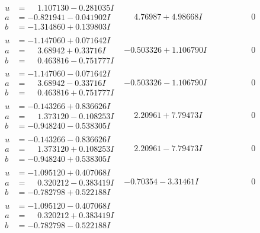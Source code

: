\documentclass[1p]{elsarticle_modified}
\theoremstyle{definition}
\begin{document}
$$\begin{array}{c|c|c}
\begin{aligned}
u &= \phantom{-}1.107130 - 0.281035 I \\
a &= -0.821941 - 0.041902 I \\
b &= -1.314860 + 0.139803 I\end{aligned}
 & \phantom{-}4.76987 + 4.98668 I & \phantom{-0.000000 } 0 \\ \hline\begin{aligned}
u &= -1.147060 + 0.071642 I \\
a &= \phantom{-}3.68942 + 0.33716 I \\
b &= \phantom{-}0.463816 - 0.751777 I\end{aligned}
 & -0.503326 + 1.106790 I & \phantom{-0.000000 } 0 \\ \hline\begin{aligned}
u &= -1.147060 - 0.071642 I \\
a &= \phantom{-}3.68942 - 0.33716 I \\
b &= \phantom{-}0.463816 + 0.751777 I\end{aligned}
 & -0.503326 - 1.106790 I & \phantom{-0.000000 } 0 \\ \hline\begin{aligned}
u &= -0.143266 + 0.836626 I \\
a &= \phantom{-}1.373120 - 0.108253 I \\
b &= -0.948240 - 0.538305 I\end{aligned}
 & \phantom{-}2.20961 + 7.79473 I & \phantom{-0.000000 } 0 \\ \hline\begin{aligned}
u &= -0.143266 - 0.836626 I \\
a &= \phantom{-}1.373120 + 0.108253 I \\
b &= -0.948240 + 0.538305 I\end{aligned}
 & \phantom{-}2.20961 - 7.79473 I & \phantom{-0.000000 } 0 \\ \hline\begin{aligned}
u &= -1.095120 + 0.407068 I \\
a &= \phantom{-}0.320212 - 0.383419 I \\
b &= -0.782798 + 0.522188 I\end{aligned}
 & -0.70354 - 3.31461 I & \phantom{-0.000000 } 0 \\ \hline\begin{aligned}
u &= -1.095120 - 0.407068 I \\
a &= \phantom{-}0.320212 + 0.383419 I \\
b &= -0.782798 - 0.522188 I\end{aligned}

\end{array}$$
\end{document}
